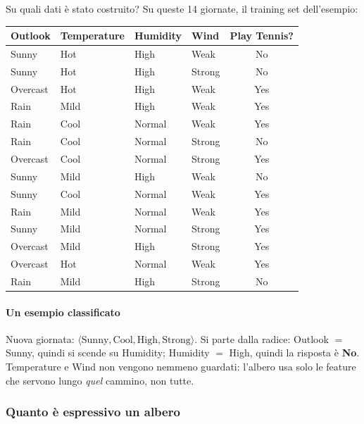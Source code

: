 \documentclass[12pt]{extarticle}
\begin{document}
\noindent Su quali dati è stato costruito? Su queste 14 giornate, il training set dell'esempio:

\begin{center}
\footnotesize
\setlength{\tabcolsep}{4.5pt}
\begin{tabular}{llllc}
    \toprule
    \textbf{Outlook} & \textbf{Temperature} & \textbf{Humidity} & \textbf{Wind} & \textbf{Play Tennis?} \\
    \midrule
    Sunny    & Hot  & High   & Weak   & No  \\
    Sunny    & Hot  & High   & Strong & No  \\
    Overcast & Hot  & High   & Weak   & Yes \\
    Rain     & Mild & High   & Weak   & Yes \\
    Rain     & Cool & Normal & Weak   & Yes \\
    Rain     & Cool & Normal & Strong & No  \\
    Overcast & Cool & Normal & Strong & Yes \\
    Sunny    & Mild & High   & Weak   & No  \\
    Sunny    & Cool & Normal & Weak   & Yes \\
    Rain     & Mild & Normal & Weak   & Yes \\
    Sunny    & Mild & Normal & Strong & Yes \\
    Overcast & Mild & High   & Strong & Yes \\
    Overcast & Hot  & Normal & Weak   & Yes \\
    Rain     & Mild & High   & Strong & No  \\
    \bottomrule
\end{tabular}
\end{center}

\paragraph{Un esempio classificato}
Nuova giornata: $\langle \text{Sunny}, \text{Cool}, \text{High}, \text{Strong} \rangle$. Si parte dalla radice: Outlook $=$ Sunny, quindi si scende su Humidity; Humidity $=$ High, quindi la risposta è \textbf{No}. Temperature e Wind non vengono nemmeno guardati: l'albero usa solo le feature che servono lungo \emph{quel} cammino, non tutte.

\subsubsection{Quanto è espressivo un albero}
\end{document}
